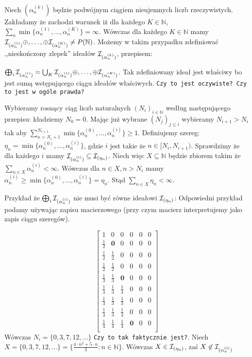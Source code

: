 \documentclass[12pt]{article}
\theoremstyle{plain}
\theoremstyle{definition}
\theoremstyle{remark}
\newcommand{\nnatural}{\mathbb{N}}
\newcommand{\cI}{{\cal I}}
\newcommand{\todo}[1]{{\tt #1}}
\begin{document}
Niech $(\alpha_n^{(k)})$ będzie podwójnym ciągiem nieujemnych liczb
rzeczywistych. Zakładamy że zachodzi warunek
iż dla każdego $K \in \nnatural$, 
$\sum_n \min \{\alpha_n^{(1)}, \ldots, \alpha_n^{(K)}\} = \infty$.
Wówczas dla każdego $K \in \nnatural$ mamy
$\cI_{(\alpha_n^{(1)})} \oplus,\ldots,\oplus \cI_{(\alpha_n^{(K)})} \not= P(\nnatural)$.
Możemy w takim przypadku zdefiniować ,,nieskończony zlepek'' ideałów 
$\cI_{(\alpha_n^{(k)})}$, przepisem:			 
	
$\bigoplus_{i}\cI_{(\alpha_n^{(i)})} = \bigcup_{K} \cI_{(\alpha_n^{(1)})} \oplus,\ldots,\oplus \cI_{(\alpha_n^{(K)})}$.
Tak zdefiniowany ideał jest właściwy bo jest sumą wstępującego ciągu ideałów właściwych.
\todo{Czy to jest oczywiste? Czy to jest w ogóle prawda?}

Wybieramy rosnący ciąg liczb naturalnych $(N_i)_{i\in\nnatural}$ według następującego przepisu: kładziemy $N_0 = 0$. Mając już wybrane $(N_j)_{j \leq i}$
wybieramy $N_{i + 1} > N_{i}$ tak aby $\sum_{n = N_{i} + 1}^{N_{i+1}} \min\{\alpha_n^{(0)} , \ldots, \alpha_n^{(i)} \} \geq 1$.
Definiujemy szereg: $\eta_n = \min\{\alpha_n^{(0)} , \ldots, \alpha_n^{(i)}\}$, gdzie $i$ jest
takie że $n \in [N_i, N_{i+1})$. Sprawdzimy że dla każdego $i$ mamy 
$\cI_{(\alpha_n^{(i)})} \subseteq \cI_{(\eta_n)}$.				
Niech więc $X \subseteq \nnatural$ będzie zbiorem takim że 
$\sum_{n\in X} \alpha_n^{(i)} < \infty$. Wówczas dla $n\in X, n > N_i$ mamy
$\alpha_n^{(i)} \geq \min\{\alpha_n^{(0)} , \ldots, \alpha_n^{(i)}\} = \eta_n$.
Stąd $\sum_{n\in X}\eta_n < \infty$.

Przykład że $\bigoplus_{i}\cI_{(\alpha_n^{(i)})}$ nie musi być
równe ideałowi $\cI_{(\eta_n)}$: 
Odpowiedni przykład podamy używając zapisu macierzowego
(przy czym macierz interpretujemy jako zapis ciągu szeregów).
	

\[
  \begin{bmatrix}
         1      &           0 & 0 & 0 & 0 & 0\\
    \frac{1}{2} &  \mathbf{0} & 0 & 0 & 0 & 0\\
    \frac{1}{2} & \frac{1}{2} & 0 & 0 & 0 & 0\\
    \frac{1}{2} & \frac{1}{2} & 0 & 0 & 0 & 0\\
    \frac{1}{3} & \frac{1}{3} & \mathbf{0} & 0 & 0 & 0\\
    \frac{1}{3} & \frac{1}{3} & \frac{1}{3} & 0 & 0 & 0\\
    \frac{1}{3} & \frac{1}{3} & \frac{1}{3} & 0 & 0 & 0\\
    \frac{1}{3} & \frac{1}{3} & \frac{1}{3} & 0 & 0 & 0\\
    \frac{1}{4} & \frac{1}{4} & \frac{1}{4} & \mathbf{0} & 0 & 0\\
  \end{bmatrix}
\]
Wówczas $N_i = \{0, 3, 7, 12, \ldots \}$ \todo{Czy to tak faktycznie jest?}.
Niech $X = \{0, 3, 7, 12, \ldots\} = \{ \frac{4 \cdot n^2 + 5 \cdot n}{3} \colon n \in\nnatural \}$.
Wówczas $X \in \cI_{(\eta_n)}$, zaś $X\not\in\cI_{(\alpha_n^{(i)})}$
\end{document}

